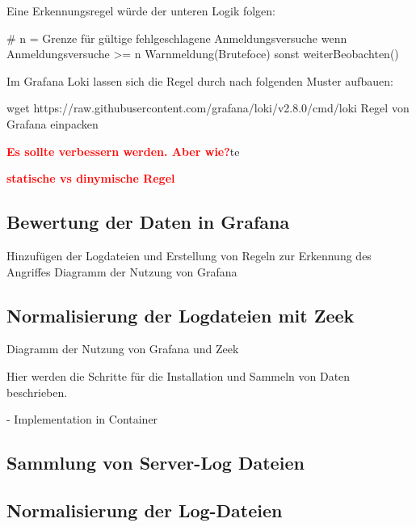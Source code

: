 Eine Erkennungsregel würde der unteren Logik folgen:
{
\begin{spverbatim}
   # n = Grenze für gültige fehlgeschlagene Anmeldungsversuche
   wenn Anmeldungsversuche >= n
      Warnmeldung(Brutefoce)
   sonst
      weiterBeobachten()
\end{spverbatim}
}

Im Grafana Loki lassen sich die Regel durch  nach folgenden Muster aufbauen:
{
\begin{spverbatim}
wget https://raw.githubusercontent.com/grafana/loki/v2.8.0/cmd/loki
Regel von Grafana einpacken
\end{spverbatim}
}

\textcolor{red}{\textbf{Es sollte verbessern werden. Aber wie?}}te



\textcolor{red}{\textbf{statische vs dinymische Regel}}



\subsection{Bewertung der Daten in Grafana}
Hinzufügen der Logdateien und Erstellung von Regeln zur Erkennung des Angriffes
Diagramm der Nutzung von Grafana

\subsection{Normalisierung der Logdateien mit Zeek}
Diagramm der Nutzung von Grafana und Zeek

Hier werden die Schritte für die Installation und Sammeln von Daten beschrieben.

- Implementation in Container %


\subsection{Sammlung von Server-Log Dateien}

\subsection{Normalisierung der Log-Dateien}





